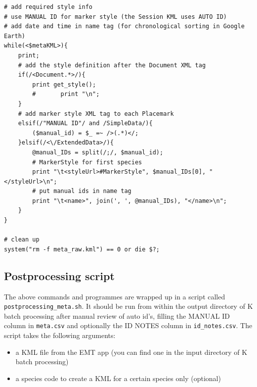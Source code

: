 \documentclass[English, 11pt, twoside, authoryear]{article}
\begin{document}
\begin{lstlisting}
# add required style info
# use MANUAL ID for marker style (the Session KML uses AUTO ID)
# add date and time in name tag (for chronological sorting in Google Earth)
while(<$metaKML>){
    print;
    # add the style definition after the Document XML tag
    if(/<Document.*>/){
        print get_style();
        #       print "\n";
    }   
    # add marker style XML tag to each Placemark
    elsif(/"MANUAL ID"/ and /SimpleData/){
        ($manual_id) = $_ =~ />(.*)</;
    }elsif(/<\/ExtendedData>/){
        @manual_IDs = split(/;/, $manual_id);
        # MarkerStyle for first species
        print "\t<styleUrl>#MarkerStyle", $manual_IDs[0], "</styleUrl>\n"; 
        # put manual ids in name tag
        print "\t<name>", join(', ', @manual_IDs), "</name>\n"; 
    }   
}

# clean up
system("rm -f meta_raw.kml") == 0 or die $?;
\end{lstlisting}

%
%
\subsection{Postprocessing script}
%
%

The above commands and programmes are wrapped up in a script called \texttt{postprocessing\_meta.sh}.
It should be run from within the output directory of \textsf{K} batch processing after manual review of auto id's, filling the MANUAL ID column in \texttt{meta.csv} and optionally the ID NOTES column in \texttt{id\_notes.csv}. The script takes the following arguments:
\begin{itemize}
\item a KML file from the EMT app (you can find one in the input directory of \textsf{K} batch processing)
\item a species code to create a KML for a certain species only (optional)
\end{itemize}
\end{document}
